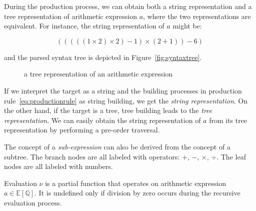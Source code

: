 During the production process, we can obtain both a string representation and a tree representation of arithmetic expression $a$,
where the two representations are equivalent.
For instance, the string representation of $a$ might be:

\begin{equation}
(((((1 \times 2) \times 2) - 1) \times (2 + 1)) - 6)\label{eq:equation}
\end{equation}

and the parsed syntax tree is depicted in Figure~\ref{fig:syntaxtree}.

\begin{figure}[ht]
\centering
{}
\caption{a tree representation of an arithmetic expression}\label{fig:syntaxtree}\label{fig:figure}
\end{figure}

If we interpret the target as a string and the building processes in production rule~\eqref{eq:productionrule} as string building, we get the \emph{string representation}.
On the other hand, if the target is a tree, tree building leads to the \emph{tree representation}.
We can easily obtain the string representation of $a$ from its tree representation by performing a pre-order traversal.

The concept of a \emph{sub-expression} can also be derived from the concept of a subtree.
The branch nodes are all labeled with operators: $+$, $-$, $\times$, $\div$.
The leaf nodes are all labeled with numbers.

Evaluation $\nu$ is a partial function that operates on arithmetic expression $a \in \mathbb{E} \left [\mathbb{Q} \right ]$.
It is undefined only if division by zero occurs during the recursive evaluation process.

